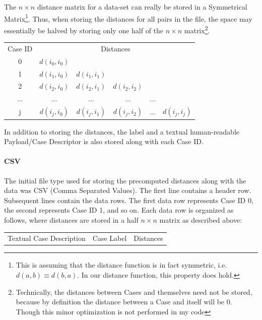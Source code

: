 \documentclass[a4paper,11pt]{report}
\begin{document}
The $n \times n$ distance matrix for a data-set can really be stored in a Symmetrical Matrix\footnote{This is assuming that the distance function is in fact symmetric, i.e. $d(a, b)\equiv d(b, a)$. In our distance function, this property does hold.}. Thus, when storing the distances for all pairs in the file, the space may essentially be halved by storing only one half of the $n \times n$ matrix\footnote{Technically, the distances between Cases and themselves need not be stored, because by definition the distance between a Case and itself will be 0. Though this minor optimization is not performed in my code}.

\medskip

\begin{tabular}{ c c c c c c }
	Case ID & \multicolumn{5}{c}{Distances} \\
	0 & $d(i_{0},i_{0})$ &  &  &  & \\
	1 & $d(i_{1},i_{0})$ & $d(i_{1},i_{1})$ &  &  &  \\
	2 & $d(i_{2},i_{0})$ & $d(i_{2},i_{1})$ & $d(i_{2},i_{2})$ &  & \\ 
	... & ... & ... & ... & ... & \\ 
	j & $d(i_{j},i_{0})$ & $d(i_{j},i_{1})$ & $d(i_{j},i_{2})$ & ... & $d(i_{j},i_{j})$ \\ 
\end{tabular}

\medskip

In addition to storing the distances, the label and a textual human-readable Payload/Case Descriptor is also stored along with each Case ID.

\paragraph{CSV}
The initial file type used for storing the precomputed distances along with the data was CSV (Comma Separated Values). The first line contains a header row. Subsequent lines contain the data rows. The first data row represents Case ID 0, the second represents Case ID 1, and so on. Each data row is organized as follows, where distances are stored in a half $n \times n$ matrix as described above:
\medskip

\begin{tabular}{ |c| |c| |c| }
	Textual Case Description & Case Label & Distances \\
\end{tabular}

\medskip
\end{document}
